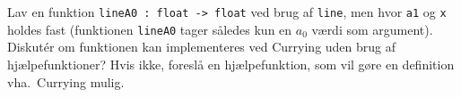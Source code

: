 Lav en funktion \lstinline{lineA0 : float -> float} ved brug af \lstinline{line}, men hvor \lstinline{a1} og \lstinline{x} holdes fast (funktionen \lstinline{lineA0} tager således kun en $a_0$ værdi som argument). Diskut\' {e}r om funktionen kan implementeres ved Currying uden brug af hjælpefunktioner? Hvis ikke, foreslå en hjælpefunktion, som vil gøre en definition vha.\ Currying mulig.
